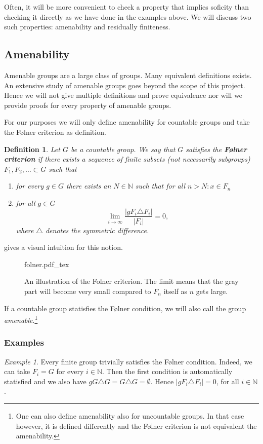 \documentclass[titlepage, a4paper]{article}
\newcommand{\N}{\mathbb{N}}
\newcommand{\card}[1]{\left| #1 \right|}
\newtheorem{definition}[theorem]{Definition}
\theoremstyle{remark}
\newtheorem{example}[theorem]{Example}
\newcommand{\incfig}[1]{%
    \def\svgwidth{.5\columnwidth}
    {#1.pdf_tex}
}
\begin{document}
    Often, it will be more convenient to check a property that implies soficity than checking it directly as we have done in the examples above. We will discuss two such properties: amenability and residually finiteness.

    \subsection{Amenability}

    Amenable groups are a large class of groups. 
    Many equivalent definitions exists. 
    An extensive study of amenable groups goes beyond the scope of this project. Hence we will not give multiple definitions and prove equivalence nor will we provide proofs for every property of amenable groups.

    For our purposes we will only define amenability for countable groups and take the Følner criterion as definition.

    \begin{definition}\cite{noauthor_folner_2019} \label{def:folner}
	    Let $G$ be a countable group. We say that $G$ satisfies the \textbf{Følner criterion} if there exists a sequence of finite subsets (not necessarily subgroups) $F_1, F_2, \dots \subset G$ such that 
        \begin{enumerate}
            \item for every $g \in G$ there exists an $N \in \N$ such that for all $n > N: x \in F_n$
            \item for all $g \in G$ 
            \[\lim_{i\to \infty} \frac{\card{gF_i \triangle F_i}}{\card{F_i}} = 0, \]
            where $\triangle$ denotes the symmetric difference.
        \end{enumerate}
    \end{definition}
     gives a visual intuition for this notion. 
\begin{figure}[ht]
    \centering
    \incfig{folner}
    \caption{An illustration of the Folner criterion. The limit means that the gray part will become very small compared to  $F_n$ itself as $n$ gets large.}
    \label{fig:folner}
\end{figure}
If a countable group statisfies the Følner condition, we will also call the group \emph{amenable}.\footnote{One can also define amenability also for uncountable groups. In that case however, it is defined differently and the Følner criterion is not equivalent the amenability.}
\subsubsection{Examples}
\begin{example}\label{ex:finite_group_folner}
    Every finite group trivially satisfies the Følner condition. Indeed, we can take $F_i = G$ for every $i \in \N$. Then the first condition is automatically statisfied and we also have $gG \triangle G = G \triangle G = \emptyset$. Hence $\card{gF_i\triangle F_i} = 0$, for all $i \in \N$.
\end{example}
\end{document}
